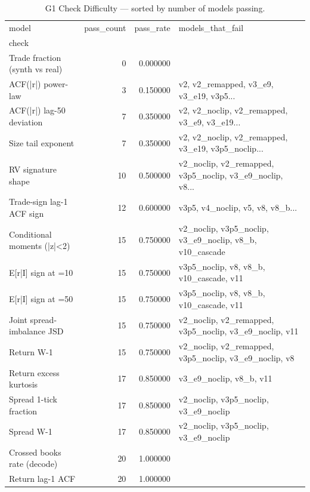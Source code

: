 \begin{table}
\caption{G1 Check Difficulty — sorted by number of models passing.}
\label{tab:g1_difficulty}
\begin{tabular}{lrrl}
\toprule
model & pass\_count & pass\_rate & models\_that\_fail \\
check &  &  &  \\
\midrule
Trade fraction (synth vs real) & 0 & 0.000000 &  \\
ACF(|r|) power-law & 3 & 0.150000 & v2, v2\_remapped, v3\_e9, v3\_e19, v3p5... \\
ACF(|r|) lag-50 deviation & 7 & 0.350000 & v2, v2\_noclip, v2\_remapped, v3\_e9, v3\_e19... \\
Size tail exponent & 7 & 0.350000 & v2, v2\_noclip, v2\_remapped, v3\_e19, v3p5\_noclip... \\
RV signature shape & 10 & 0.500000 & v2\_noclip, v2\_remapped, v3p5\_noclip, v3\_e9\_noclip, v8... \\
Trade-sign lag-1 ACF sign & 12 & 0.600000 & v3p5, v4\_noclip, v5, v8, v8\_b... \\
Conditional moments (|z|<2) & 15 & 0.750000 & v2\_noclip, v3p5\_noclip, v3\_e9\_noclip, v8\_b, v10\_cascade \\
E[r|I] sign at =10 & 15 & 0.750000 & v3p5\_noclip, v8, v8\_b, v10\_cascade, v11 \\
E[r|I] sign at =50 & 15 & 0.750000 & v3p5\_noclip, v8, v8\_b, v10\_cascade, v11 \\
Joint spread-imbalance JSD & 15 & 0.750000 & v2\_noclip, v2\_remapped, v3p5\_noclip, v3\_e9\_noclip, v11 \\
Return W-1 & 15 & 0.750000 & v2\_noclip, v2\_remapped, v3p5\_noclip, v3\_e9\_noclip, v8 \\
Return excess kurtosis & 17 & 0.850000 & v3\_e9\_noclip, v8\_b, v11 \\
Spread 1-tick fraction & 17 & 0.850000 & v2\_noclip, v3p5\_noclip, v3\_e9\_noclip \\
Spread W-1 & 17 & 0.850000 & v2\_noclip, v3p5\_noclip, v3\_e9\_noclip \\
Crossed books rate (decode) & 20 & 1.000000 &  \\
Return lag-1 ACF & 20 & 1.000000 &  \\
\bottomrule
\end{tabular}
\end{table}

